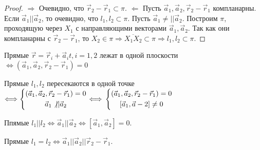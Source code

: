 \begin{proof}
	\(\Longrightarrow\) Очевидно, что \(\vec r_2-\vec r_1 \subset \pi\).\newline
	\(\Longleftarrow\) Пусть \(\vec a_1, \vec a_2, \vec r_2 - \vec r_1\) компланарны. Если \(\vec a_1 || \vec a_2\), то очевидно, что \(l_1, l_2 \subset \pi\). \newline
	Пусть \(\vec a_1 \ne || \vec a_2\). Построим \(\pi\), проходящую через \(X_1\) с направляющими векторами \(\vec a_1, \vec a_2\). Так как они компланарны с \(\vec r_2 - \vec r_1\), то \(X_2\in\pi\Longrightarrow \overline{X_1X_2}\subset \pi \Longrightarrow l_1, l_2\subset \pi\).
\end{proof}
\begin{corollary}
	Прямые \(\vec r = \vec r_i + \vec a_it, i = 1, 2\) лежат в одной плоскости \(\Longleftrightarrow (\vec a_1, \vec a_2, \vec r_2 - \vec r_1) = 0\)
\end{corollary}
\begin{corollary}
	Прямые \(l_1, l_2\) пересекаются в одной точке \(\Longleftrightarrow \left\{\begin{gathered}
		(\vec a_1, \vec a_2, \vec r_2 - \vec r_1) = 0 \\
		\vec a_1 \not||\vec a_2
	\end{gathered}\right.\Longleftrightarrow\newline \left\{\begin{gathered}
	(\vec a_1, \vec a_2, \vec r_2 - \vec r_1) = 0 \\
	[\vec a_1, \vec a-2]\ne0
	\end{gathered}\right.\)
\end{corollary}
\begin{corollary}
	Ппямые \(l_1||l_2 \Longleftrightarrow \vec a_1 || \vec a_2 \Longleftrightarrow  [\vec a_1, \vec a_2] = 0\).
\end{corollary}
\begin{corollary}
	Прямые \(l_1 = l_2 \Longleftrightarrow \vec a_1 || \vec a_2 || \vec r_2 - \vec r_1\).
\end{corollary}

